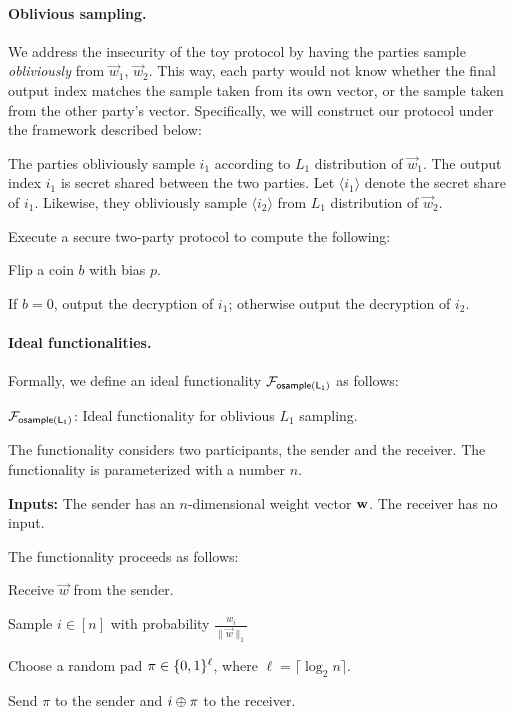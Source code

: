 \paragraph{Oblivious sampling.}  
We address the insecurity of the toy protocol by having the parties
sample \emph{obliviously} from $\vec w_1$, $\vec w_2$.  This way, each
party would not know whether the final output index matches the sample
taken from its own vector, or the sample taken from the other party's
vector. Specifically, we will construct our protocol under the framework
described below: 

\BEN
\item The parties obliviously sample $i_1$ according to $L_1$
distribution of $\vec w_1$. The output index $i_1$ is secret shared
between the two parties. Let $\langle i_1 \rangle$ denote the secret share of $i_1$.
Likewise, they obliviously sample $\langle i_2 \rangle$ from $L_1$ distribution of
$\vec w_2$.

\item Execute a secure two-party protocol to compute the following:
  \BEN
  \item Flip a coin $b$ with bias $p$. 
  \item If $b=0$, output the decryption of $i_1$; otherwise output
  the decryption of $i_2$. 
  \EEN
\EEN


\paragraph{Ideal functionalities.}
Formally, we define an ideal functionality $\mathcal{F}_{{\mathsf{osample(L_1)}}}$ as follows:

\bbox
{
\begin{center}
 $\mathcal{F}_{{\mathsf{osample(L_1)}}}$:  Ideal functionality for oblivious $L_1$ sampling.
\end{center}

The functionality considers two participants, the sender and the
receiver. The functionality is parameterized with a number $n$. 

\medskip

\textbf{Inputs:} The sender has an $n$-dimensional weight vector $\mathbf{w}$.
The receiver has no input. 

\medskip

The functionality proceeds as follows:
\BEN
\item Receive $\vec w$ from the sender.
\item Sample $i \in [n]$ with probability $\frac{w_i}{ \|\vec{w}\|_1 }$
\item Choose a random pad $\pi \in \{0,1\}^\ell$, where $\ell = \lceil \log_2 n \rceil$. 
\item Send $\pi$ to the sender and $i \oplus \pi$ to the receiver. 

\EEN 
}

